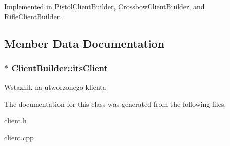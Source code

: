 Implemented in \hyperlink{classPistolClientBuilder_a74f10c9d757f56e3cc1ae6257a09fea6}{PistolClientBuilder}, \hyperlink{classCrossbowClientBuilder_a1ed4ca8da04961a163aca90d4f7978ee}{CrossbowClientBuilder}, and \hyperlink{classRifleClientBuilder_a65d74c8413cd74184e974b3457d7aaea}{RifleClientBuilder}.



\subsection{Member Data Documentation}
\hypertarget{classClientBuilder_a18ca0906572c5a1a86000c7a51175c23}{
\subsubsection[{itsClient}]{$\ast$ {\bf ClientBuilder::itsClient}}}
\label{classClientBuilder_a18ca0906572c5a1a86000c7a51175c23}
Wstaznik na utworzonego klienta 

The documentation for this class was generated from the following files:\begin{DoxyCompactItemize}
\item 
client.h\item 
client.cpp\end{DoxyCompactItemize}
